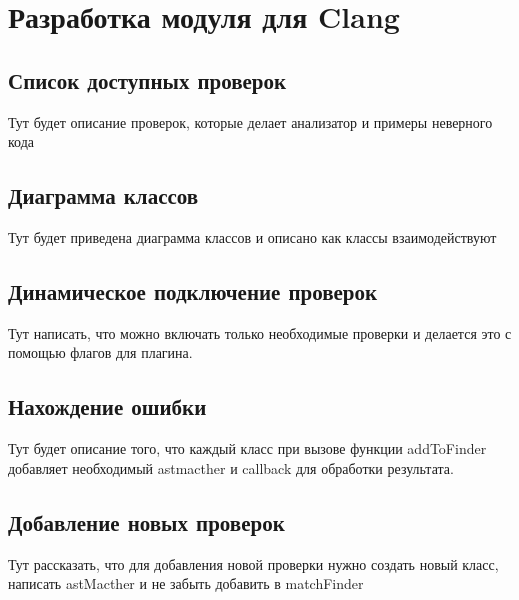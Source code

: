 \chapter{Разработка модуля для Clang}

\section{Список доступных проверок}
Тут будет описание проверок, которые делает анализатор и примеры неверного кода

\section{Диаграмма классов}
Тут будет приведена диаграмма классов и описано как классы взаимодействуют

\section{Динамическое подключение проверок}
Тут написать, что можно включать только необходимые проверки и делается это с помощью флагов 
для плагина.

\section{Нахождение ошибки}
Тут будет описание того, что каждый класс при вызове функции addToFinder
добавляет необходимый astmacther и callback для обработки результата.

\section{Добавление новых проверок}
Тут рассказать, что для добавления новой проверки нужно создать новый класс, написать astMacther
и не забыть добавить в matchFinder
